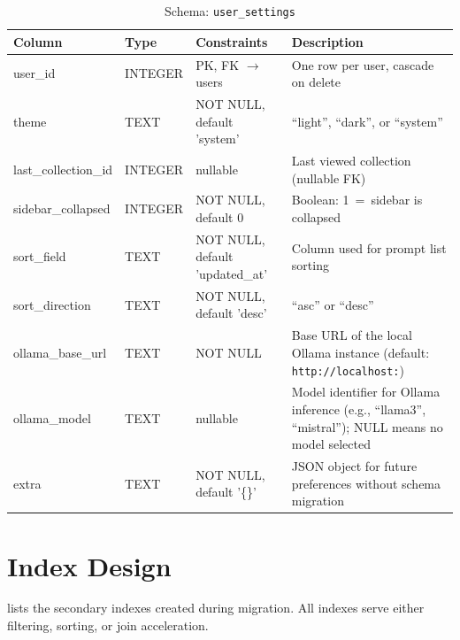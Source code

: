 \documentclass[a4paper, 11pt, oneside]{report}
\begin{document}
\begin{table}[H]
  \centering
  \caption{Schema: \texttt{user\_settings}}
  \label{tab:schema-user-settings}
  \footnotesize
  \begin{tabularx}{\textwidth}{l l L{3.8cm} X}
    \toprule
    \textbf{Column} & \textbf{Type} & \textbf{Constraints} & \textbf{Description} \\
    \midrule
    user\_id                & INTEGER & PK, FK $\to$ users     & One row per user, cascade on delete \\
    theme                   & TEXT    & NOT NULL, default 'system' & ``light'', ``dark'', or ``system'' \\
    last\_collection\_id    & INTEGER & nullable               & Last viewed collection (nullable FK) \\
    sidebar\_collapsed      & INTEGER & NOT NULL, default 0    & Boolean: 1~=~sidebar is collapsed \\
    sort\_field             & TEXT    & NOT NULL, default 'updated\_at' & Column used for prompt list sorting \\
    sort\_direction         & TEXT    & NOT NULL, default 'desc' & ``asc'' or ``desc'' \\
    ollama\_base\_url       & TEXT    & NOT NULL             & Base URL of the local Ollama instance
                                                                (default: \texttt{http://localhost:}) \\
    ollama\_model           & TEXT    & nullable               & Model identifier for Ollama inference
                                                                (e.g., ``llama3'', ``mistral'');
                                                                NULL means no model selected \\
    extra                   & TEXT    & NOT NULL, default '\{\}' & JSON object for future preferences
                                                                  without schema migration \\
    \bottomrule
  \end{tabularx}
\end{table}

\section{Index Design}
\label{sec:indexes}

 lists the secondary indexes created during migration.
All indexes serve either filtering, sorting, or join acceleration.
\end{document}
